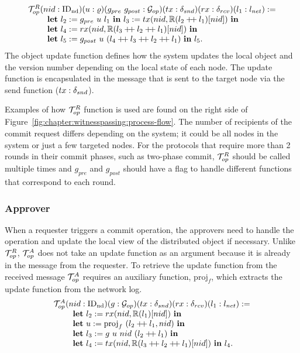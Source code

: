 $$
\begin{array}{l}
\opfunction (nid: \nodeid) (u : \updatefunc) (g_{pre}\ g_{post}:  \gopfunction)
	(tx: \sendfunction)
	(rx: \recvfunction)
	(l_1  :\networklog ) := \\
\ \ \ \ \ \ \ \mbox{\textbf{let}} \ l_2 := g_{pre}\ u \ l_1  \ \mbox{\textbf{in}}\   l_3 := tx(nid, \replay(l_2 \mdoubleplus l_1)[nid]) \ \mbox{\textbf{in}}  \\
\ \ \ \ \ \ \ \mbox{\textbf{let}} \ l_4 := rx(nid, \replay(l_3 \mdoubleplus l_2 \mdoubleplus l_1)[nid]) \
	\mbox{\textbf{in}} \\
\ \ \ \ \ \ \ \mbox{\textbf{let}} \ l_5 := 	 g_{post}\  u \ (l_4 \mdoubleplus l_3 \mdoubleplus l_2 \mdoubleplus l_1) \ \mbox{\textbf{in}}\ l_5.
\end{array}
$$
The object update function defines how the system updates the local object and
the version number depending on the local state of each node.
The update function is encapsulated in the message that is sent to the target node
via the send function ($tx : \delta_{snd}$).

Examples of how $\mathcal{T}^{R}_{op}$ function is used are found on the right side
of Figure~\ref{fig:chapter:witnesspassing:process-flow}. The number of recipients of the commit request differs depending
on the system; it could be all nodes in the system or just a few targeted nodes.
For the protocols that require more than 2 rounds in their commit phases, such as 
two-phase commit, $\mathcal{T}^{R}_{op}$ should be called multiple times and $g_{pre}$ and
$g_{post}$ should have a flag to handle different functions that correspond to
each round. 

\subsubsection{Approver}
When a requester triggers a commit operation, the approvers need to
handle the operation and update the local view of the distributed object if
necessary. Unlike $\mathcal{T}^{R}_{op}$, $\mathcal{T}^{A}_{op}$ does not take an update function as an argument
because it is already in the message from the requester.
To retrieve the update function from the received message $\mathcal{T}^{A}_{op}$ requires
an auxiliary function, $\mathrm{proj}_{f}$, which extracts the update function from the network log.
$$
\begin{array}{l}
	\mathcal{T}^{A}_{op} (nid: \mathrm{ID_{nd}}) (g:  \mathcal{G}_{op})
	(tx: \delta_{snd})(rx: \delta_{rcv})(l_1  :{l_{net}} ) := \\
\ \ \ \ \ \ \ \mbox{\textbf{let}} \ l_2 := rx(nid, \mathbb{R}(l_1)[nid]) \
  \mbox{\textbf{in}} \\
\ \ \ \ \ \ \ \mbox{\textbf{let}} \ u := \mathrm{proj}_{f} \ (l_2 \mathbin{+\mkern-4mu+} l_1, nid) \
  \mbox{\textbf{in}} \\
\ \ \ \ \ \ \ \mbox{\textbf{let}}\ l_3  := g\ u\ nid \ (l_2 \mathbin{+\mkern-4mu+} l_1) \ \mbox{\textbf{in}} \\
\ \ \ \ \ \ \ \mbox{\textbf{let}} \ l_4 := tx(nid, \mathbb{R}(l_3 \mathbin{+\mkern-4mu+} l_2 \mathbin{+\mkern-4mu+} l_1)[nid]) \ \mbox{\textbf{in}}  \ l_4.
   \\
\end{array}
$$



